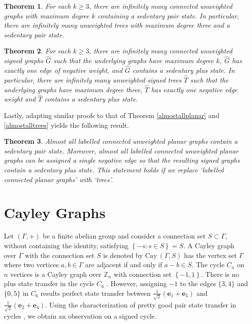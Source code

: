 \documentclass[12pt,a4paper]{article}
\newtheorem{thm}{Theorem}
\def \e {{\bf e}}
\def \e {{\mathbf e}}
\newcommand{\cb}[1]{\left\lbrace #1\right\rbrace}
\begin{document}
\begin{thm}
For each $k\geq 3$, there are infinitely many connected unweighted graphs with maximum degree $k$ containing a sedentary pair state. In particular, there are infinitely many unweighted trees with maximum degree three and a sedentary pair state.
\end{thm}

\begin{thm}
For each $k\geq 3$, there are infinitely many connected unweighted signed graphs $\hat{G}$ such that the underlying graphs have maximum degree $k$, $\hat{G}$ has exactly one edge of negative weight, and $\hat{G}$ contains a sedentary plus state. In particular, there are infinitely many unweighted signed trees $\hat{T}$ such that the underlying graphs have maximum degree three, $\hat{T}$ has exactly one negative edge weight and $\hat{T}$ contains a sedentary plus state.
\end{thm}

Lastly, adapting similar proofs to that of Theorem \ref{almostallplanar} and \ref{almostalltrees} yields the following result.

\begin{thm}
Almost all labelled connected unweighted planar graphs contain a sedentary pair state. %
Moreover, almost all labelled connected unweighted planar graphs can be assigned a single negative edge so that the resulting signed graphs contain a sedentary plus state. This statement holds if we replace `labelled connected planar graphs' with `trees'.
\end{thm}



\section{Cayley Graphs}\label{sec:cay}

Let $(\Gamma,+)$ be a finite abelian group and consider a connection set $S\subset\Gamma$, without containing the identity, satisfying  $\cb{-s : s \in S} = S.$ A Cayley graph over $\Gamma$ with the connection set $S$ is denoted by $\text{Cay}~(\Gamma, S)$ has the vertex set $\Gamma$ where two vertices $a, b \in \Gamma$ are adjacent if and
only if $a - b \in S.$ The cycle $C_n$ on $n$ vertices  is a Cayley graph over $\mathbb{Z}_n$ with connection set $\cb{-1,1}.$ There is no plus state transfer in the cycle $C_6$ \cite[Theorem 6.5]{kim}. However, assigning $-1$ to the edges $\{3,4\}$ and $\{0,5\}$ in $C_6$ results perfect state transfer between $\frac{1}{\sqrt2}(\e_1+\e_5)$ and $\frac{1}{\sqrt2}(\e_2+\e_4).$ Using the characterization of pretty good pair state transfer in cycles \cite[Theorem 9]{pal10}, we obtain an observation on a signed cycle.
\end{document}
